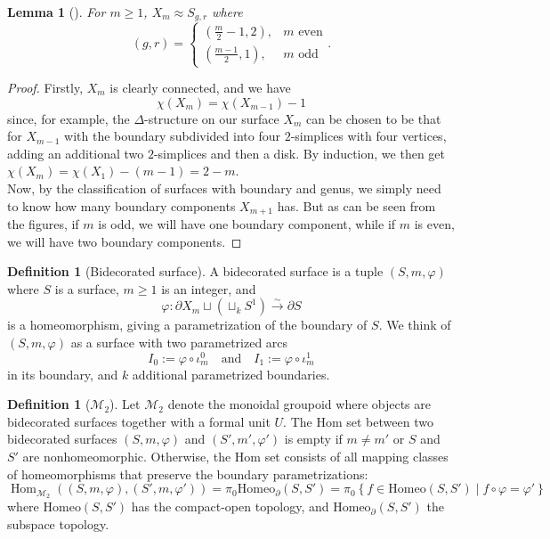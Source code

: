 \documentclass[reqno]{amsart}
\newtheorem{lemma}[theorem]{Lemma}
\theoremstyle{definition}
\newtheorem{definition}[theorem]{Definition}
\theoremstyle{remark}
\DeclareMathOperator{\Hom}{Hom}
\newcommand{\Homeo}{{\mathrm{Homeo}}}
\begin{document}
\begin{lemma}[]
    For $m\ge 1$, $X_m \approx S_{g,r}$ where
    \[
        \left( g,r \right) =
        \begin{cases}
            \left( \frac{m}{2}-1,2 \right) ,& m \text{ even}\\
            \left( \frac{m-1}{2},1 \right) ,& m \text{ odd}
        \end{cases}.
    \] 
\end{lemma}

\begin{proof}
    Firstly, $X_m$ is clearly connected, and
    we have
    \[
    \chi \left( X_{m} \right) 
    = \chi \left( X_{m-1} \right) -1
    \] 
    since, for example, the $\Delta$-structure on
    our surface $X_{m}$ can be chosen to be that for $X_{m-1}$ with
    the boundary subdivided into four $2$-simplices with 
    four vertices,
    adding an additional two $2$-simplices and then
    a disk.
    By induction, we then get
    $\chi \left( X_{m} \right) 
    = \chi \left( X_1 \right) - \left( m-1 \right) 
    = 2-m$.\\
    Now, by the classification of surfaces with
    boundary and genus, we simply need to
    know how many boundary components $X_{m+1}$ has.
    But as can be seen from the figures, 
    if $m$ is odd, we will have one boundary component,
    while if  $m$ is even, we will have
    two boundary components.
\end{proof}

\begin{definition}[Bidecorated surface]
    A bidecorated surface is a tuple
    $\left( S, m , \varphi  \right) $ where
    $S$ is a surface, $m\ge 1$ is an integer,
    and
    \[
    \varphi \colon
    \partial X_m \sqcup \left( \sqcup_{k} S^{1} \right) 
    \stackrel{\sim}{\to } \partial S
    \] 
    is a homeomorphism, giving a parametrization of the boundary of
    $S$. We think of $\left( S, m , \varphi  \right) $ as
    a surface with two parametrized arcs
    \[
    I_0 := \varphi \circ \iota_{m}^{0} \quad
    \text{and} \quad 
    I_1 := \varphi \circ \iota_m^{1}
    \] 
    in its boundary, and $k$ additional parametrized
    boundaries.
\end{definition}


\begin{definition}[$\mathcal{M}_2$]
    Let $\mathcal{M}_2$ denote the monoidal groupoid
    where objects are bidecorated surfaces together
    with a formal unit $U$. The Hom set
    between two bidecorated surfaces
    $\left( S, m, \varphi  \right) $ and
    $\left( S', m', \varphi' \right) $ is
    empty if $m\neq m'$ or $S$ and $S'$ are nonhomeomorphic.
    Otherwise, the Hom set consists of all mapping
    classes of homeomorphisms that preserve the
    boundary parametrizations:
    \[
    \Hom_{\mathcal{M}_2}\left( 
    \left( S,m,\varphi  \right) , 
\left( S', m, \varphi' \right) \right) 
= 
    \pi_0 \Homeo_{\partial}\left( S,S' \right) 
    = \pi_0 \left\{ f \in \Homeo \left( S,S' \right) 
    \mid f \circ \varphi  = \varphi' \right\}
\] 
where $\Homeo\left( S,S' \right) $ has the compact-open
topology, and 
$\Homeo_{\partial}\left( S,S' \right) $ the subspace topology.
\end{definition}
\end{document}
